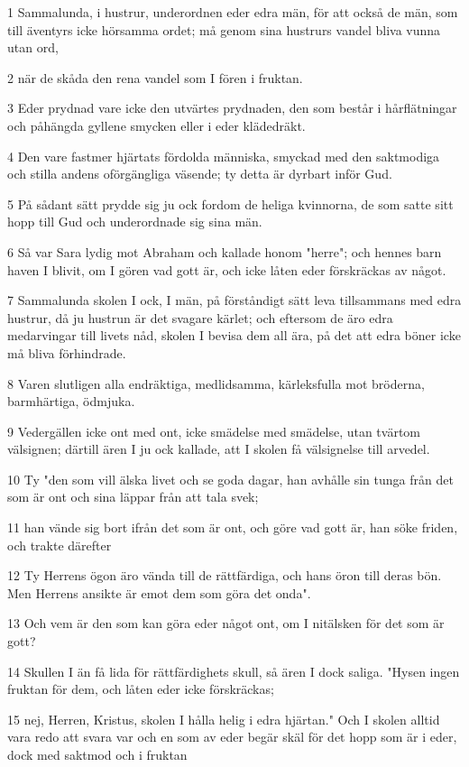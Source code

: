 \par 1 Sammalunda, i hustrur, underordnen eder edra män, för att också de män, som till äventyrs icke hörsamma ordet; må genom sina hustrurs vandel bliva vunna utan ord,
\par 2 när de skåda den rena vandel som I fören i fruktan.
\par 3 Eder prydnad vare icke den utvärtes prydnaden, den som består i hårflätningar och påhängda gyllene smycken eller i eder klädedräkt.
\par 4 Den vare fastmer hjärtats fördolda människa, smyckad med den saktmodiga och stilla andens oförgängliga väsende; ty detta är dyrbart inför Gud.
\par 5 På sådant sätt prydde sig ju ock fordom de heliga kvinnorna, de som satte sitt hopp till Gud och underordnade sig sina män.
\par 6 Så var Sara lydig mot Abraham och kallade honom "herre"; och hennes barn haven I blivit, om I gören vad gott är, och icke låten eder förskräckas av något.
\par 7 Sammalunda skolen I ock, I män, på förståndigt sätt leva tillsammans med edra hustrur, då ju hustrun är det svagare kärlet; och eftersom de äro edra medarvingar till livets nåd, skolen I bevisa dem all ära, på det att edra böner icke må bliva förhindrade.
\par 8 Varen slutligen alla endräktiga, medlidsamma, kärleksfulla mot bröderna, barmhärtiga, ödmjuka.
\par 9 Vedergällen icke ont med ont, icke smädelse med smädelse, utan tvärtom välsignen; därtill ären I ju ock kallade, att I skolen få välsignelse till arvedel.
\par 10 Ty "den som vill älska livet och se goda dagar, han avhålle sin tunga från det som är ont och sina läppar från att tala svek;
\par 11 han vände sig bort ifrån det som är ont, och göre vad gott är, han söke friden, och trakte därefter
\par 12 Ty Herrens ögon äro vända till de rättfärdiga, och hans öron till deras bön. Men Herrens ansikte är emot dem som göra det onda".
\par 13 Och vem är den som kan göra eder något ont, om I nitälsken för det som är gott?
\par 14 Skullen I än få lida för rättfärdighets skull, så ären I dock saliga. "Hysen ingen fruktan för dem, och låten eder icke förskräckas;
\par 15 nej, Herren, Kristus, skolen I hålla helig i edra hjärtan." Och I skolen alltid vara redo att svara var och en som av eder begär skäl för det hopp som är i eder, dock med saktmod och i fruktan
